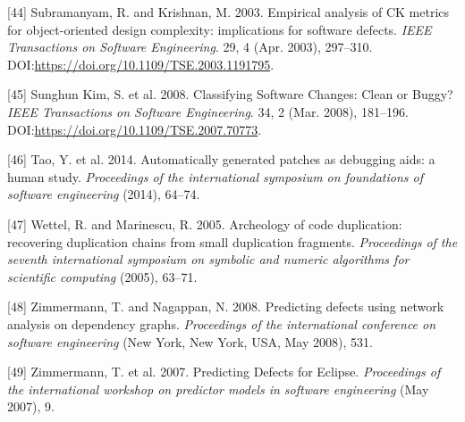 \documentclass[sigconf]{acmart}
\begin{document}
\hypertarget{ref-Subramanyam2003}{}
{[}44{]} Subramanyam, R. and Krishnan, M. 2003. Empirical analysis of CK
metrics for object-oriented design complexity: implications for software
defects. \emph{IEEE Transactions on Software Engineering}. 29, 4 (Apr.
2003), 297--310. DOI:\url{https://doi.org/10.1109/TSE.2003.1191795}.

\hypertarget{ref-SunghunKim2008}{}
{[}45{]} Sunghun Kim, S. et al. 2008. Classifying Software Changes:
Clean or Buggy? \emph{IEEE Transactions on Software Engineering}. 34, 2
(Mar. 2008), 181--196. DOI:\url{https://doi.org/10.1109/TSE.2007.70773}.

\hypertarget{ref-tao2014automatically}{}
{[}46{]} Tao, Y. et al. 2014. Automatically generated patches as
debugging aids: a human study. \emph{Proceedings of the international
symposium on foundations of software engineering} (2014), 64--74.

\hypertarget{ref-Wettel2005}{}
{[}47{]} Wettel, R. and Marinescu, R. 2005. Archeology of code
duplication: recovering duplication chains from small duplication
fragments. \emph{Proceedings of the seventh international symposium on
symbolic and numeric algorithms for scientific computing} (2005),
63--71.

\hypertarget{ref-Zimmermann2008}{}
{[}48{]} Zimmermann, T. and Nagappan, N. 2008. Predicting defects using
network analysis on dependency graphs. \emph{Proceedings of the
international conference on software engineering} (New York, New York,
USA, May 2008), 531.

\hypertarget{ref-Zimmermann2007}{}
{[}49{]} Zimmermann, T. et al. 2007. Predicting Defects for Eclipse.
\emph{Proceedings of the international workshop on predictor models in
software engineering} (May 2007), 9.



\end{document}
